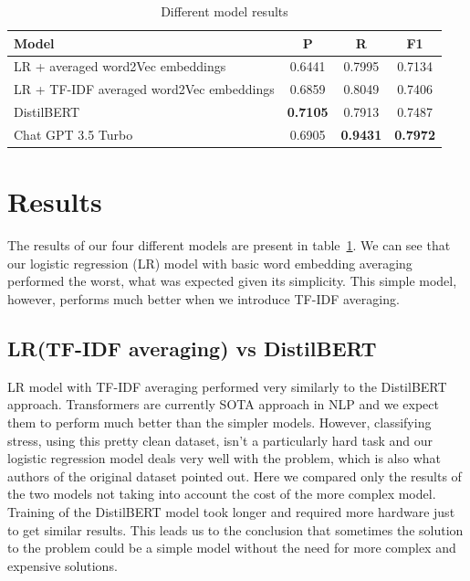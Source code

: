 \documentclass[10pt, a4paper]{article}
\begin{document}
\begin{table}
    \centering
    \caption{Different model results}
    \label{tab:model-results}
    \begin{center}
        \begin{tabular}{|l|c|c|c|}
            \hline
            \textbf{Model} & \textbf{P} & \textbf{R} & \textbf{F1} \\ \hline
            LR + averaged word2Vec embeddings & 0.6441 & 0.7995 & 0.7134 \\ \hline
            LR + TF-IDF averaged word2Vec embeddings & 0.6859 & 0.8049 & 0.7406 \\ \hline
            DistilBERT & \textbf{0.7105} & 0.7913 & 0.7487 \\ \hline
            Chat GPT 3.5 Turbo & 0.6905 & \textbf{0.9431} & \textbf{0.7972} \\ \hline
        \end{tabular}
    \end{center}
\end{table}

\section{Results}

The results of our four different models are present in table~\ref{tab:model-results}.
We can see that our logistic regression (LR) model with basic word embedding averaging performed the worst, what was expected given its simplicity.
This simple model, however, performs much better when we introduce TF-IDF averaging.
\subsection{LR(TF-IDF averaging) vs DistilBERT}
LR model with TF-IDF averaging performed very similarly to the DistilBERT approach.
Transformers are currently SOTA approach in NLP and we expect them to perform much better than the simpler models.
However, classifying stress, using this pretty clean dataset, isn't a particularly hard task and our logistic regression model deals very well with the problem, which is also what authors of the original dataset pointed out.
\hfill \break
\hfill \break
Here we compared only the results of the two models not taking into account the cost of the more complex model.
Training of the DistilBERT model took longer and required more hardware just to get similar results.
This leads us to the conclusion that sometimes the solution to the problem could be a simple model without the need for more complex and expensive solutions.
\\
\end{document}
